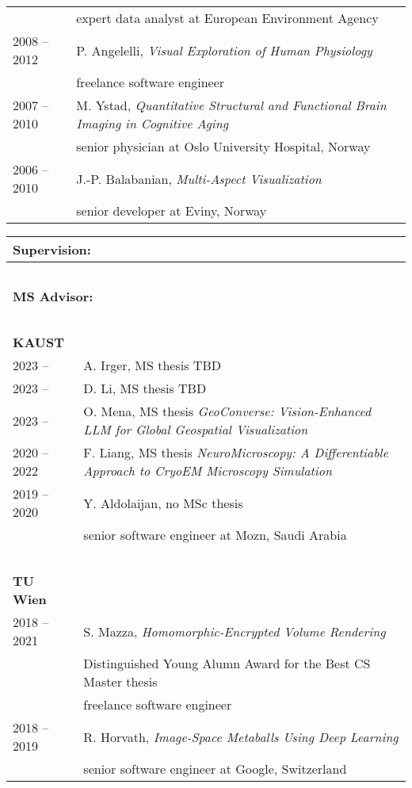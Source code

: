 \documentclass[a4paper,11pt]{letter}
\begin{document}
\begin{tabular}{l| l}
 & expert data analyst at European Environment Agency \\
2008 -- 2012 & P. Angelelli, \emph{Visual Exploration of Human Physiology} \\
 & freelance software engineer \\
2007 -- 2010 & M. Ystad, \emph{Quantitative Structural and Functional Brain Imaging in Cognitive Aging} \\
 & senior physician at Oslo University Hospital, Norway \\
2006 -- 2010 & J.-P. Balabanian, \emph{Multi-Aspect Visualization} \\
 & senior developer at Eviny, Norway \\
\end{tabular}

\begin{tabular}{l| l}
\multicolumn{2}{l}{\large{\textbf{Supervision:}}} \\
\hline
\multicolumn{2}{l}{\textbf{~}} \\
\multicolumn{2}{l}{\textbf{MS Advisor:}} \\
\multicolumn{2}{l}{\textbf{~}} \\
\textbf{KAUST} & \\
2023 --  & A. Irger, MS thesis TBD \\
2023 --  & D. Li, MS thesis TBD \\
2023 --  & O. Mena, MS thesis \emph{GeoConverse: Vision-Enhanced LLM for Global Geospatial Visualization} \\
2020 -- 2022 & F. Liang, MS thesis \emph{NeuroMicroscopy: A Differentiable Approach to CryoEM Microscopy Simulation} \\
2019 -- 2020 & Y. Aldolaijan, no MSc thesis \\
 & senior software engineer at Mozn, Saudi Arabia\\
\hline
\multicolumn{2}{l}{\textbf{~}} \\
\textbf{TU Wien} & \\
2018 -- 2021 & S. Mazza, \emph{Homomorphic-Encrypted Volume Rendering} \\
 & Distinguished Young Alumn Award for the Best CS Master thesis\\
 & freelance software engineer\\
2018 -- 2019 & R. Horvath, \emph{Image-Space Metaballs Using Deep Learning} \\
 & senior software engineer at Google, Switzerland \\

\end{tabular}
\end{document}
